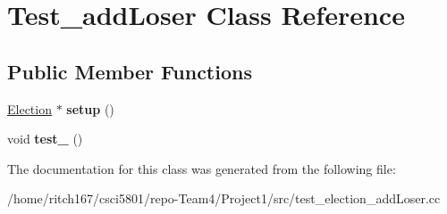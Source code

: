\hypertarget{classTest__addLoser}{}\section{Test\+\_\+add\+Loser Class Reference}
\label{classTest__addLoser}
\subsection*{Public Member Functions}
\begin{DoxyCompactItemize}
\item 
\mbox{\label{classTest__addLoser_af1732bee3734f0be557ea2de54655f71}} 
\hyperlink{classElection}{Election} $\ast$ {\bfseries setup} ()
\item 
\mbox{\label{classTest__addLoser_a5c6247bcfd521249db04ae74eec0692f}} 
void {\bfseries test\+\_} ()
\end{DoxyCompactItemize}


The documentation for this class was generated from the following file\+:\begin{DoxyCompactItemize}
\item 
/home/ritch167/csci5801/repo-\/\+Team4/\+Project1/src/test\+\_\+election\+\_\+add\+Loser.\+cc\end{DoxyCompactItemize}
